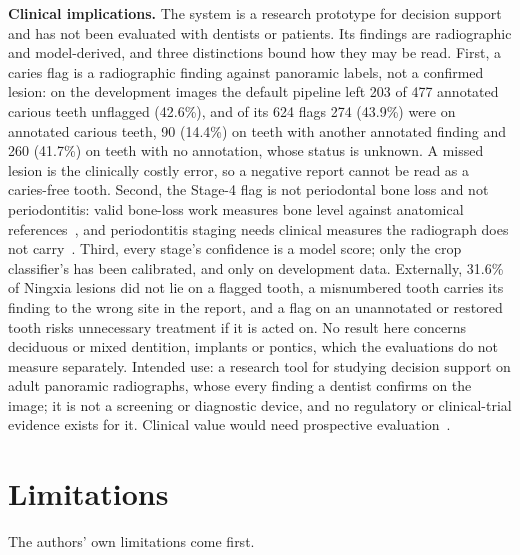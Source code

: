\documentclass[conference]{IEEEtran}
\begin{document}
\textbf{Clinical implications.} The system is a research prototype for decision support and has not been evaluated with dentists or patients. Its findings are radiographic and model-derived, and three distinctions bound how they may be read. First, a caries flag is a radiographic finding against panoramic labels, not a confirmed lesion: on the development images the default pipeline left 203 of 477 annotated carious teeth unflagged (42.6\%), and of its 624 flags 274 (43.9\%) were on annotated carious teeth, 90 (14.4\%) on teeth with another annotated finding and 260 (41.7\%) on teeth with no annotation, whose status is unknown. A missed lesion is the clinically costly error, so a negative report cannot be read as a caries-free tooth. Second, the Stage-4 flag is not periodontal bone loss and not periodontitis: valid bone-loss work measures bone level against anatomical references~\cite{krois2019deep,chang2020deep}, and periodontitis staging needs clinical measures the radiograph does not carry~\cite{tonetti2018staging}. Third, every stage's confidence is a model score; only the crop classifier's has been calibrated, and only on development data. Externally, 31.6\% of Ningxia lesions did not lie on a flagged tooth, a misnumbered tooth carries its finding to the wrong site in the report, and a flag on an unannotated or restored tooth risks unnecessary treatment if it is acted on. No result here concerns deciduous or mixed dentition, implants or pontics, which the evaluations do not measure separately. Intended use: a research tool for studying decision support on adult panoramic radiographs, whose every finding a dentist confirms on the image; it is not a screening or diagnostic device, and no regulatory or clinical-trial evidence exists for it. Clinical value would need prospective evaluation~\cite{kelly2019key}.

\section{Limitations}

The authors' own limitations come first.
\end{document}

